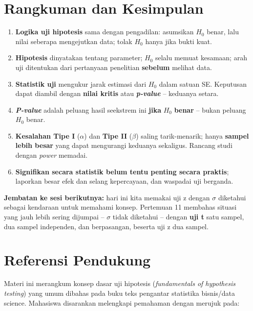 \documentclass[
  indonesian,
  letterpaper,
]{book}
\providecommand{\tightlist}{%
  \setlength{\itemsep}{0pt}\setlength{\parskip}{0pt}}
\begin{document}
\section{Rangkuman dan Kesimpulan}\label{rangkuman-dan-kesimpulan-1}

\begin{enumerate}
\def\labelenumi{\arabic{enumi}.}
\tightlist
\item
  \textbf{Logika uji hipotesis} sama dengan pengadilan: asumsikan
  \(H_0\) benar, lalu nilai seberapa mengejutkan data; tolak \(H_0\)
  hanya jika bukti kuat.
\item
  \textbf{Hipotesis} dinyatakan tentang parameter; \(H_0\) selalu memuat
  kesamaan; arah uji ditentukan dari pertanyaan penelitian
  \textbf{sebelum} melihat data.
\item
  \textbf{Statistik uji} mengukur jarak estimasi dari \(H_0\) dalam
  satuan SE. Keputusan dapat diambil dengan \textbf{nilai kritis} atau
  \textbf{\emph{p-value}} -- keduanya setara.
\item
  \textbf{\emph{P-value}} adalah peluang hasil seekstrem ini
  \textbf{jika} \(H_0\) \textbf{benar} -- bukan peluang \(H_0\) benar.
\item
  \textbf{Kesalahan Tipe I} (\(\alpha\)) dan \textbf{Tipe II}
  (\(\beta\)) saling tarik-menarik; hanya \textbf{sampel lebih besar}
  yang dapat mengurangi keduanya sekaligus. Rancang studi dengan
  \emph{power} memadai.
\item
  \textbf{Signifikan secara statistik belum tentu penting secara
  praktis}; laporkan besar efek dan selang kepercayaan, dan waspadai uji
  berganda.
\end{enumerate}

\textbf{Jembatan ke sesi berikutnya:} hari ini kita memakai uji z dengan
\(\sigma\) diketahui sebagai kendaraan untuk memahami konsep. Pertemuan
11 membahas situasi yang jauh lebih sering dijumpai -- \(\sigma\) tidak
diketahui -- dengan \textbf{uji t} satu sampel, dua sampel independen,
dan berpasangan, beserta uji z dua sampel.

\section{Referensi Pendukung}\label{referensi-pendukung-1}

Materi ini merangkum konsep dasar uji hipotesis (\emph{fundamentals of
hypothesis testing}) yang umum dibahas pada buku teks pengantar
statistika bisnis/data science. Mahasiswa disarankan melengkapi
pemahaman dengan merujuk pada:
\end{document}
